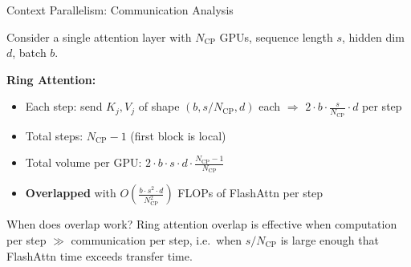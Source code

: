 \begin{frame}{Context Parallelism: Communication Analysis}

  Consider a single attention layer with $N_{\text{CP}}$ GPUs, sequence length $s$, hidden dim $d$, batch $b$.

  \vspace{0.3em}
  \textbf{Ring Attention:}
  \begin{itemize}
    \item Each step: send $K_j, V_j$ of shape $(b, s/N_\text{CP}, d)$ each $\Rightarrow$ $2 \cdot b \cdot \frac{s}{N_\text{CP}} \cdot d$ per step
    \item Total steps: $N_\text{CP} - 1$ (first block is local)
    \item Total volume per GPU: $2 \cdot b \cdot s \cdot d \cdot \frac{N_\text{CP} - 1}{N_\text{CP}}$
    \item \textbf{Overlapped} with $O\!\left(\frac{b \cdot s^2 \cdot d}{N_\text{CP}^2}\right)$ FLOPs of FlashAttn per step
  \end{itemize}

  \vspace{0.3em}
  \begin{alertblock}{When does overlap work?}
    Ring attention overlap is effective when computation per step $\gg$ communication per step, i.e.\ when $s / N_\text{CP}$ is large enough that FlashAttn time exceeds transfer time.
  \end{alertblock}
\end{frame}

